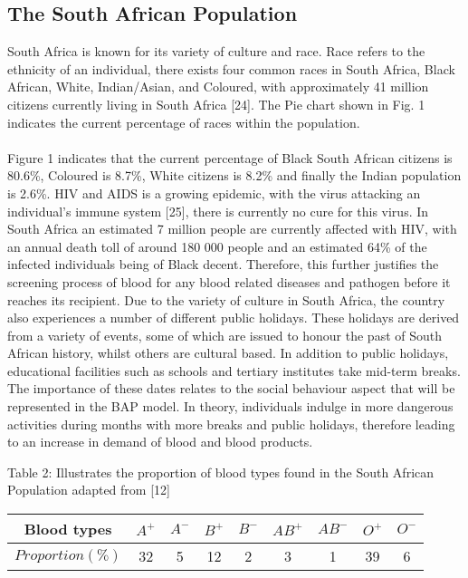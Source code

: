 \documentclass{article}
\begin{document}
\subsection{The South African Population}
South Africa is known for its variety of culture and race. Race refers to the ethnicity of an individual, there exists four common races in South Africa, Black African, White, Indian/Asian, and Coloured, with approximately 41 million citizens currently living in South Africa [24]. The Pie chart shown in Fig. 1 indicates the current percentage of races within the population.
\\
\\
Figure 1 indicates that the current percentage of Black South African citizens is 80.6\%, Coloured is 8.7\%, White citizens is 8.2\% and finally the Indian population is 2.6\%. HIV and AIDS is a growing epidemic, with the virus attacking an individual’s immune system [25], there is currently no cure for this virus. In South Africa an estimated 7 million people are currently affected with HIV, with an annual death toll of around 180 000 people and an estimated 64\% of the infected individuals being of Black decent. Therefore, this further justifies the screening process of blood for any blood related diseases and pathogen before it reaches its recipient. Due to the variety of culture in South Africa, the country also experiences a number of different public holidays. These holidays are derived from a variety of events, some of which are issued to honour the past of South African history, whilst others are cultural based. In addition to public holidays, educational facilities such as schools and tertiary institutes take mid-term breaks. The importance of these dates relates to the social behaviour aspect that will be represented in the BAP model. In theory, individuals indulge in more dangerous activities during months with more breaks and public holidays, therefore leading to an increase in demand of blood and blood products.
\begin {center}
Table 2: {Illustrates the proportion of blood types found in the South African Population adapted from [12] }

\end {center}
\begin{center}
\begin {tabular}{|c|c|c|c|c|c|c|c|c|}
\hline

Blood types& $A^+$&$A^-$&$B^+$& $B^-$& $AB^+$& $AB^-$&  $O^+$& $O^-$ \\ [0.5ex]
\hline

 $Proportion(\%)$&32&5&12&2&3&1&39&6\\
 
\hline

\end {tabular}

\end {center}
\end{document}
